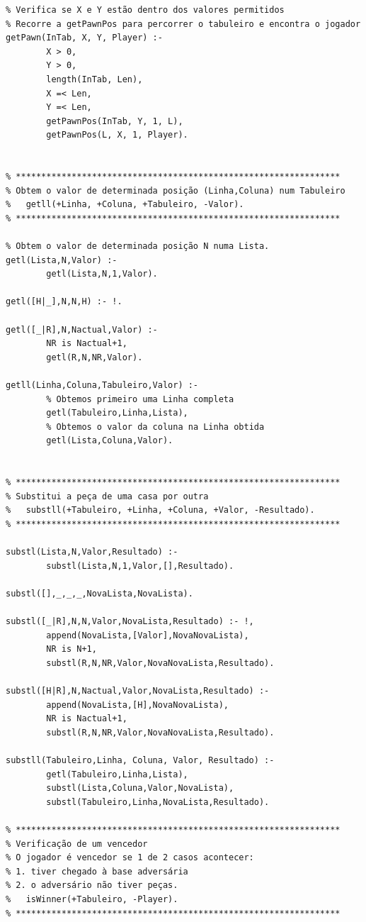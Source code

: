 \documentclass[15pt,a4paper]{article}
\begin{document}
\begin{lstlisting}
% Verifica se X e Y estão dentro dos valores permitidos
% Recorre a getPawnPos para percorrer o tabuleiro e encontra o jogador
getPawn(InTab, X, Y, Player) :-
		X > 0,
		Y > 0,
		length(InTab, Len),
		X =< Len,
		Y =< Len,
		getPawnPos(InTab, Y, 1, L),
		getPawnPos(L, X, 1, Player).

        
% ****************************************************************
% Obtem o valor de determinada posição (Linha,Coluna) num Tabuleiro
%	getll(+Linha, +Coluna, +Tabuleiro, -Valor).
% ****************************************************************

% Obtem o valor de determinada posição N numa Lista.
getl(Lista,N,Valor) :-
		getl(Lista,N,1,Valor).

getl([H|_],N,N,H) :- !.

getl([_|R],N,Nactual,Valor) :-
		NR is Nactual+1,
		getl(R,N,NR,Valor).

getll(Linha,Coluna,Tabuleiro,Valor) :-
		% Obtemos primeiro uma Linha completa
		getl(Tabuleiro,Linha,Lista),
		% Obtemos o valor da coluna na Linha obtida
		getl(Lista,Coluna,Valor).
                 
                 
% ****************************************************************
% Substitui a peça de uma casa por outra
%	substll(+Tabuleiro, +Linha, +Coluna, +Valor, -Resultado).
% ****************************************************************

substl(Lista,N,Valor,Resultado) :-
        substl(Lista,N,1,Valor,[],Resultado).

substl([],_,_,_,NovaLista,NovaLista).

substl([_|R],N,N,Valor,NovaLista,Resultado) :- !,
		append(NovaLista,[Valor],NovaNovaLista),
		NR is N+1,
		substl(R,N,NR,Valor,NovaNovaLista,Resultado).

substl([H|R],N,Nactual,Valor,NovaLista,Resultado) :-
		append(NovaLista,[H],NovaNovaLista),
		NR is Nactual+1,
		substl(R,N,NR,Valor,NovaNovaLista,Resultado).

substll(Tabuleiro,Linha, Coluna, Valor, Resultado) :-
		getl(Tabuleiro,Linha,Lista),
		substl(Lista,Coluna,Valor,NovaLista),
		substl(Tabuleiro,Linha,NovaLista,Resultado).

% ****************************************************************
% Verificação de um vencedor
% O jogador é vencedor se 1 de 2 casos acontecer:
% 1. tiver chegado à base adversária
% 2. o adversário não tiver peças.
%	isWinner(+Tabuleiro, -Player).
% ****************************************************************


\end{lstlisting}
\end{document}

